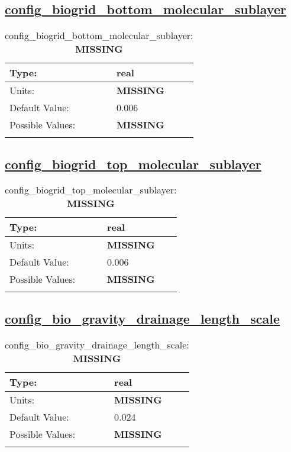 \subsection[config\_biogrid\_bottom\_molecular\_sublayer]{\hyperref[sec:nm_tab_biogeochemistry]{config\_biogrid\_bottom\_molecular\_sublayer}}
\label{subsec:nm_sec_config_biogrid_bottom_molecular_sublayer}
\begin{center}
\begin{longtable}{| p{2.0in} || p{4.0in} |}
    \hline
    Type: & real \\
    \hline
    Units: & {\bf \color{red} MISSING} \\
    \hline
    Default Value: & 0.006 \\
    \hline
    Possible Values: & {\bf \color{red} MISSING} \\
    \hline
    \caption{config\_biogrid\_bottom\_molecular\_sublayer: {\bf \color{red} MISSING}}
\end{longtable}
\end{center}
\subsection[config\_biogrid\_top\_molecular\_sublayer]{\hyperref[sec:nm_tab_biogeochemistry]{config\_biogrid\_top\_molecular\_sublayer}}
\label{subsec:nm_sec_config_biogrid_top_molecular_sublayer}
\begin{center}
\begin{longtable}{| p{2.0in} || p{4.0in} |}
    \hline
    Type: & real \\
    \hline
    Units: & {\bf \color{red} MISSING} \\
    \hline
    Default Value: & 0.006 \\
    \hline
    Possible Values: & {\bf \color{red} MISSING} \\
    \hline
    \caption{config\_biogrid\_top\_molecular\_sublayer: {\bf \color{red} MISSING}}
\end{longtable}
\end{center}
\subsection[config\_bio\_gravity\_drainage\_length\_scale]{\hyperref[sec:nm_tab_biogeochemistry]{config\_bio\_gravity\_drainage\_length\_scale}}
\label{subsec:nm_sec_config_bio_gravity_drainage_length_scale}
\begin{center}
\begin{longtable}{| p{2.0in} || p{4.0in} |}
    \hline
    Type: & real \\
    \hline
    Units: & {\bf \color{red} MISSING} \\
    \hline
    Default Value: & 0.024 \\
    \hline
    Possible Values: & {\bf \color{red} MISSING} \\
    \hline
    \caption{config\_bio\_gravity\_drainage\_length\_scale: {\bf \color{red} MISSING}}
\end{longtable}
\end{center}
